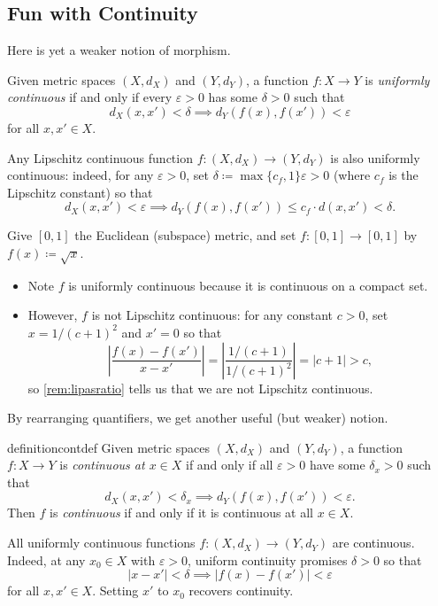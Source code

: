 \documentclass[../notes.tex]{subfiles}
\begin{document}
\subsection{Fun with Continuity}
Here is yet a weaker notion of morphism.
\begin{defihelper} 
	Given metric spaces $(X,d_X)$ and $(Y,d_Y)$, a function $f\colon X\to Y$ is \textit{uniformly continuous} if and only if every $\varepsilon>0$ has some $\delta>0$ such that
	\[d_X(x,x')<\delta\implies d_Y(f(x),f(x'))<\varepsilon\]
	for all $x,x'\in X$.
\end{defihelper}
\begin{example} \label{ex:lip-is-uni-cont}
	Any Lipschitz continuous function $f\colon(X,d_X)\to(Y,d_Y)$ is also uniformly continuous: indeed, for any $\varepsilon>0$, set $\delta\coloneqq\max\{c_f,1\}\varepsilon>0$ (where $c_f$ is the Lipschitz constant) so that
	\[d_X(x,x')<\varepsilon\implies d_Y(f(x),f(x'))\le c_f\cdot d(x,x')<\delta.\]
\end{example}
\begin{example}
	Give $[0,1]$ the Euclidean (subspace) metric, and set $f\colon[0,1]\to[0,1]$ by $f(x)\coloneqq\sqrt x$.
	\begin{itemize}
		\item Note $f$ is uniformly continuous because it is continuous on a compact set.
		\item However, $f$ is not Lipschitz continuous: for any constant $c>0$, set $x=1/(c+1)^2$ and $x'=0$ so that
		\[\left|\frac{f(x)-f(x')}{x-x'}\right|=\left|\frac{1/(c+1)}{1/(c+1)^2}\right|=|c+1|>c,\]
		so \autoref{rem:lipasratio} tells us that we are not Lipschitz continuous.
	\end{itemize}
\end{example}
By rearranging quantifiers, we get another useful (but weaker) notion.
\begin{restatable}[Continuous]{definition}{contdef}
	Given metric spaces $(X,d_X)$ and $(Y,d_Y)$, a function $f\colon X\to Y$ is \textit{continuous at $x\in X$} if and only if all $\varepsilon>0$ have some $\delta_x>0$ such that
	\[d_X(x,x')<\delta_x\implies d_Y(f(x),f(x'))<\varepsilon.\]
	Then $f$ is \textit{continuous} if and only if it is continuous at all $x\in X$.
\end{restatable}
\begin{example} \label{ex:uniform-cont-is-cont}
	All uniformly continuous functions $f\colon(X,d_X)\to(Y,d_Y)$ are continuous. Indeed, at any $x_0\in X$ with $\varepsilon>0$, uniform continuity promises $\delta>0$ so that
	\[|x-x'|<\delta\implies|f(x)-f(x')|<\varepsilon\]
	for all $x,x'\in X$. Setting $x'$ to $x_0$ recovers continuity.
\end{example}
\end{document}
